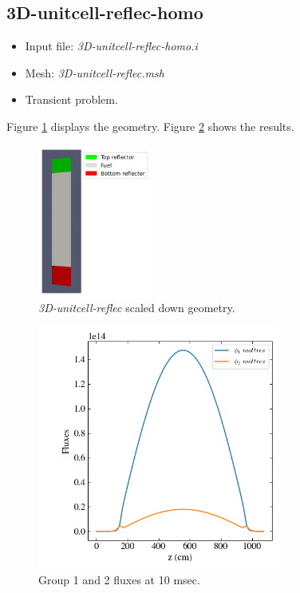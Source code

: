 \documentclass[11pt,letterpaper]{article}
\begin{document}
\subsection{3D-unitcell-reflec-homo}

	\begin{itemize}
		\item Input file: \textit{3D-unitcell-reflec-homo.i}
		\item Mesh: \textit{3D-unitcell-reflec.msh}
		\item Transient problem.
	\end{itemize}

Figure \ref{fig:3D-unitcell-reflec-homo} displays the geometry.
Figure \ref{fig:3D-unitcell-reflec-homo1} shows the results.

	\begin{figure}[htbp!]
		\centering
		\includegraphics[height=5cm]{3D-unitcell-reflec-homo-mesh}
		\caption{\textit{3D-unitcell-reflec} scaled down geometry.}
		\label{fig:3D-unitcell-reflec-homo}
	\end{figure}

	\begin{figure}[htbp!]
		\centering
		\includegraphics[height=8cm]{3D-unitcell-reflec-homo}
		\caption{Group 1 and 2 fluxes at 10 msec.}
		\label{fig:3D-unitcell-reflec-homo1}
	\end{figure}
\end{document}
